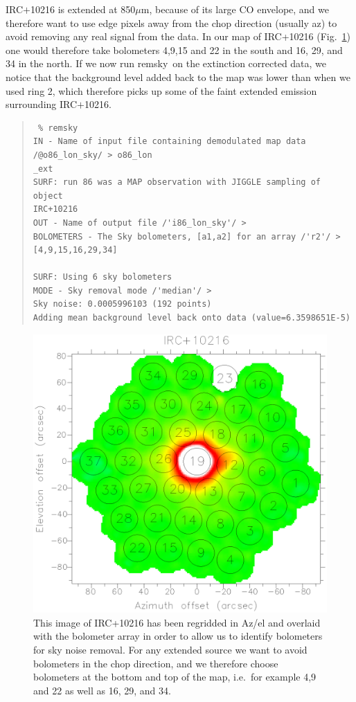 \documentclass[twoside,11pt]{article}
\newenvironment{myquote}{\begin{quote}\begin{small}}{\end{small}\end{quote}}
\newcommand{\task}[1]{\textsf{#1}}
\newcommand{\remsky}{\xref{\task{remsky}}{sun216}{REMSKY}}
\newcommand{\xref}[3]{#1}
\renewcommand{\_}{\texttt{\symbol{95}}}
\begin{document}
IRC$+$10216 is extended at 850$\mu$m, because of its large CO
envelope, and we therefore want to use edge pixels away from the chop
direction (usually az) to avoid removing any real signal from the
data.  In our map of IRC+10216 (Fig.\ \ref{fig:irc}) one would
therefore take bolometers 4,9,15 and 22 in the south and 16, 29, and
34 in the north.  If we now run \remsky\ on the extinction corrected
data, we notice that the background level added back to the map was
lower than when we used ring 2, which therefore picks up some of the
faint extended emission surrounding IRC$+$10216.


\begin{myquote}
\begin{verbatim}
 % remsky
IN - Name of input file containing demodulated map data 
/@o86_lon_sky/ > o86_lon
_ext
SURF: run 86 was a MAP observation with JIGGLE sampling of object 
IRC+10216
OUT - Name of output file /'i86_lon_sky'/ > 
BOLOMETERS - The Sky bolometers, [a1,a2] for an array /'r2'/ > 
[4,9,15,16,29,34]

SURF: Using 6 sky bolometers
MODE - Sky removal mode /'median'/ > 
Sky noise: 0.0005996103 (192 points)
Adding mean background level back onto data (value=6.3598651E-5)
\end{verbatim}
\end{myquote}


\begin{figure}
\begin{center}
\includegraphics[width=\textwidth]{sc11_fig4.eps}
\caption{This image of IRC+10216 has been regridded in Az/el and
overlaid with the bolometer array in order to allow us to identify
bolometers for sky noise removal. For any extended source we want to
avoid bolometers in the chop direction, and we therefore choose
bolometers at the bottom and top of the map, i.e.\ for example 4,9 and
22 as well as 16, 29, and 34.}
\label{fig:irc}
\end{center}
\end{figure}
\end{document}
